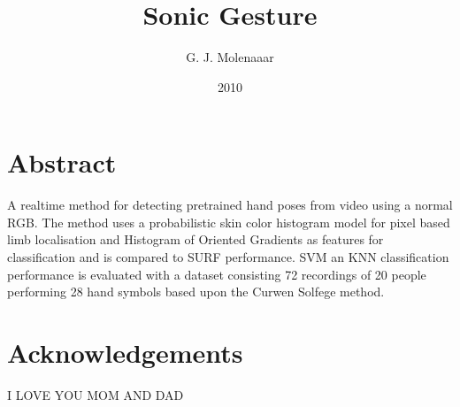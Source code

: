 \documentclass[a4paper]{book}
\begin{document}
\title{Sonic Gesture}
\author{G. J. Molenaaar}
\date{2010}

\maketitle{}

\newpage{}

\chapter*{Abstract}
A real\-time method for detecting pre\-trained hand poses from
video using a normal RGB. The method uses a probabilistic skin color histogram model for pixel based limb localisation and Histogram of Oriented Gradients as features for classification and is compared to SURF performance. SVM an KNN classification performance is evaluated with a dataset consisting 72 recordings of 20 people performing 28 hand symbols based upon the Curwen Solfege method. 

\tableofcontents{}
\listoffigures{}
\listoftables{}

\chapter*{Acknowledgements}
I LOVE YOU MOM AND DAD


















\end{document}
